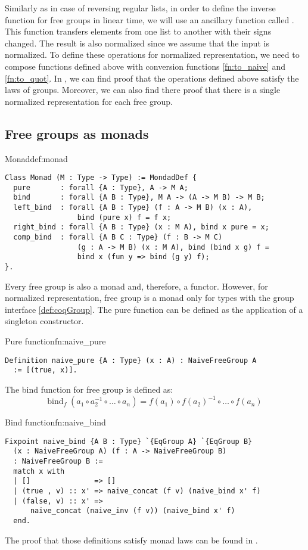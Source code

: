 Similarly as in case of reversing regular lists, in order to define the inverse function for free groups  in linear time, we will use an ancillary function called . This function transfers elements from one list to another with their signs changed. The result is also normalized since we assume that the input is normalized.
To define these operations for normalized representation, we need to compose functions defined above with conversion functions \ref{fn:to_naive} and \ref{fn:to_quot}. In , we can find proof that the operations defined above satisfy the laws of groups. Moreover, we can also find there proof that there is a single normalized representation for each free group.  
\subsection{Free groups as monads}
\begin{defi}{Monad}{def:monad}
\begin{verbatim}
Class Monad (M : Type -> Type) := MondadDef {
  pure       : forall {A : Type}, A -> M A;
  bind       : forall {A B : Type}, M A -> (A -> M B) -> M B;
  left_bind  : forall {A B : Type} (f : A -> M B) (x : A), 
                 bind (pure x) f = f x; 
  right_bind : forall {A B : Type} (x : M A), bind x pure = x; 
  comp_bind  : forall {A B C : Type} (f : B -> M C) 
                 (g : A -> M B) (x : M A), bind (bind x g) f = 
                 bind x (fun y => bind (g y) f);
}.
\end{verbatim}
\end{defi}
Every free group is also a monad and, therefore, a functor. However, for normalized representation, free group is a monad only for types with the group interface \ref{def:coqGroup}. The pure function can be defined as the application of a singleton constructor.
\begin{func}{Pure function}{fn:naive_pure}
\begin{verbatim}
Definition naive_pure {A : Type} (x : A) : NaiveFreeGroup A 
  := [(true, x)].
\end{verbatim}
\end{func}
The bind function for free group is defined as:
$$
    \textrm{bind}_f \; (a_1 \circ a_2^{-1} \circ \dots \circ a_n) = f (a_1) \circ f (a_2) ^{-1} \circ \dots \circ f (a_n)
$$
\begin{func}{Bind function}{fn:naive_bind}
\begin{verbatim}
Fixpoint naive_bind {A B : Type} `{EqGroup A} `{EqGroup B} 
  (x : NaiveFreeGroup A) (f : A -> NaiveFreeGroup B) 
  : NaiveFreeGroup B :=
  match x with
  | []               => []
  | (true , v) :: x' => naive_concat (f v) (naive_bind x' f)
  | (false, v) :: x' => 
      naive_concat (naive_inv (f v)) (naive_bind x' f)
  end.
\end{verbatim}
\end{func}
The proof that those definitions satisfy monad laws can be found in .
